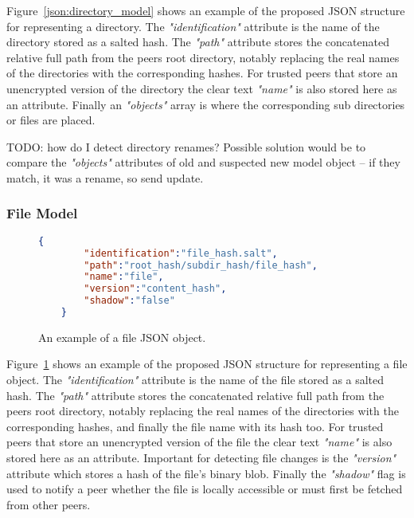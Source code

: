 Figure~\ref{json:directory_model} shows an example of the proposed JSON structure for representing a directory.
The \textit{"identification"} attribute is the name of the directory stored as a salted hash.
The \textit{"path"} attribute stores the concatenated relative full path from the peers root directory, notably replacing the real names of the directories with the corresponding hashes.
For trusted peers that store an unencrypted version of the directory the clear text \textit{"name"} is also stored here as an attribute.
Finally an \textit{"objects"} array is where the corresponding sub directories or files are placed.

TODO: how do I detect directory renames?
Possible solution would be to compare the \textit{"objects"} attributes of old and suspected new model object – if they match, it was a rename, so send update.

\subsubsection{File Model}
\label{sec:file_model}

\begin{figure}[htp]
    \begin{lstlisting}[language=json,firstnumber=0]
    {
        "identification":"file_hash.salt",
        "path":"root_hash/subdir_hash/file_hash",
        "name":"file",
        "version":"content_hash",
        "shadow":"false"
    }
    \end{lstlisting}
\caption[File JSON Model]{An example of a file JSON object.}
\label{json:file_model}
\end{figure}

Figure~\ref{json:file_model} shows an example of the proposed JSON structure for representing a file object.
The \textit{"identification"} attribute is the name of the file stored as a salted hash.
The \textit{"path"} attribute stores the concatenated relative full path from the peers root directory, notably replacing the real names of the directories with the corresponding hashes, and finally the file name with its hash too.
For trusted peers that store an unencrypted version of the file the clear text \textit{"name"} is also stored here as an attribute.
Important for detecting file changes is the \textit{"version"} attribute which stores a hash of the file's binary blob.
Finally the \textit{"shadow"} flag is used to notify a peer whether the file is locally accessible or must first be fetched from other peers.

